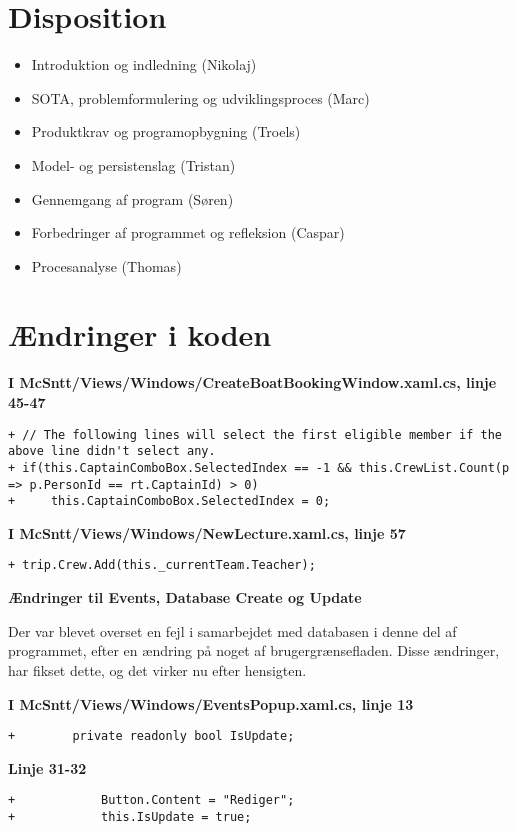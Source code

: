 \documentclass[a4paper,11pt,fleqn,twoside,openright,final]{memoir}
\begin{document}
\sloppy


\chapter{Disposition}

	\begin{itemize}
	\item Introduktion og indledning (Nikolaj)
	\item SOTA, problemformulering og udviklingsproces (Marc)
	\item Produktkrav og programopbygning (Troels)
	\item Model- og persistenslag (Tristan)
	\item Gennemgang af program (Søren)
	\item Forbedringer af programmet og refleksion (Caspar)
	\item Procesanalyse	(Thomas)
	\end{itemize}

\chapter{Ændringer i koden}

\textbf{I McSntt/Views/Windows/CreateBoatBookingWindow.xaml.cs, linje 45-47}
\lstset{firstnumber=45}
\begin{lstlisting}[frame=single, caption=CreateBoatBookingWindow.cs ændringer, label=fntpg-cb]
+ // The following lines will select the first eligible member if the above line didn't select any.
+ if(this.CaptainComboBox.SelectedIndex == -1 && this.CrewList.Count(p => p.PersonId == rt.CaptainId) > 0) 
+     this.CaptainComboBox.SelectedIndex = 0;
\end{lstlisting}

\lstset{firstnumber=57}
\textbf{I McSntt/Views/Windows/NewLecture.xaml.cs, linje 57}
\begin{lstlisting}[frame=single, caption=NewLecture.xaml.cs ændringer, label=fntpg-cb]
+ trip.Crew.Add(this._currentTeam.Teacher);
\end{lstlisting}

\textbf{Ændringer til Events, Database Create og Update}

Der var blevet overset en fejl i samarbejdet med databasen i denne del af programmet, efter en ændring på noget af brugergrænsefladen.
Disse ændringer, har fikset dette, og det virker nu efter hensigten.

\lstset{firstnumber=13}
\textbf{I McSntt/Views/Windows/EventsPopup.xaml.cs, linje 13}
\begin{lstlisting}[frame=single, caption=EventsPopup.xaml.cs ændringer, label=fntpg-cb]
+        private readonly bool IsUpdate;
\end{lstlisting}
\lstset{firstnumber=31}
\textbf{Linje 31-32}
\begin{lstlisting}[frame=single, label=fntpg-cb]
+            Button.Content = "Rediger";
+            this.IsUpdate = true;
\end{lstlisting}
\end{document}
